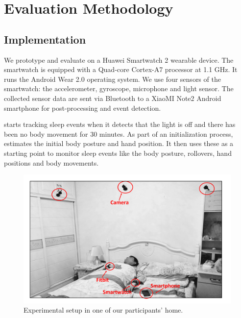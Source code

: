 \section{Evaluation Methodology}
\subsection{Implementation}
We prototype and evaluate \systemname on a Huawei Smartwatch 2 wearable device. The smartwatch is equipped with a Quad-core Cortex-A7
processor at 1.1 GHz.  It runs the Android Wear 2.0 operating system. We use four sensors of the smartwatch: the accelerometer, gyroscope,
microphone and light sensor. The collected sensor data are sent via Bluetooth to a XiaoMI Note2 Android smartphone for post-processing and
event detection.

\systemname starts tracking sleep events when it detects that the light is off and there has been no body movement for 30 minutes. As part
of an initialization process, \systemname estimates the initial body posture and hand position. It then uses these as a starting point to
monitor sleep events like the body posture, rollovers, hand positions and body movements.



\begin{figure}[!t]
	\centering
	\includegraphics[width=0.52\linewidth]{Figures/setup.pdf}
	\caption{Experimental setup in one of our participants' home. }\label{fig:setup}
\end{figure}



